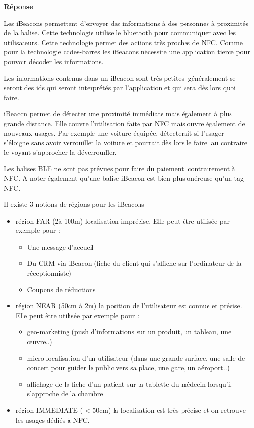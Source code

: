 \documentclass[francais,12pt]{article}
\begin{document}
	{\color[rgb]{0,0.5,0.23}\textbf{Réponse}}
	
	Les iBeacons permettent d'envoyer des informations à des personnes à proximités de la balise. Cette technologie utilise le bluetooth pour communiquer avec les utilisateurs. Cette technologie permet des actions très proches de NFC. Comme pour la technologie codes-barres les iBeacons nécessite une application tierce pour pouvoir décoder les informations.
	
	Les informations contenus dans un iBeacon sont très petites, généralement se seront des ids qui seront interprétés par l'application et qui sera dès lors quoi faire.
	
	iBeacon permet de détecter une proximité immédiate mais également à plus grande distance. Elle couvre l'utilisation faite par NFC mais ouvre également de nouveaux usages. Par exemple une voiture équipée, détecterait si l'usager s'éloigne sans avoir verrouiller la voiture et pourrait dès lors le faire, au contraire le voyant s'approcher la déverrouiller.
	
	Les balises BLE ne sont pas prévues pour faire du paiement, contrairement à NFC. A noter également qu'une balise iBeacon est bien plus onéreuse qu'un tag NFC.
	
	Il existe 3 notions de régions pour les iBeacons
	\begin{itemize}
		\item région FAR (2à 100m) localisation imprécise. Elle peut être utilisée par exemple pour :
		\begin{itemize}
			\item Une message d'accueil
			\item Du CRM via iBeacon (fiche du client qui s'affiche sur l'ordinateur de la réceptionniste)
			\item Coupons de réductions
		\end{itemize}
		\item région NEAR (50cm à 2m) la position de l'utilisateur est connue et précise. Elle peut être utilisée par exemple pour :
		\begin{itemize}
			\item geo-marketing (push d'informations sur un produit, un tableau, une œuvre..)
			\item micro-localisation d'un utilisateur (dans une grande surface, une salle de concert pour guider le public vers sa place, une gare, un aéroport..)
			\item affichage de la fiche d'un patient sur la tablette du médecin lorsqu'il s'approche de la chambre
		\end{itemize}
		\item région IMMEDIATE ( < 50cm) la localisation est très précise et on retrouve les usages dédiés à NFC.
	\end{itemize}
\end{document}
